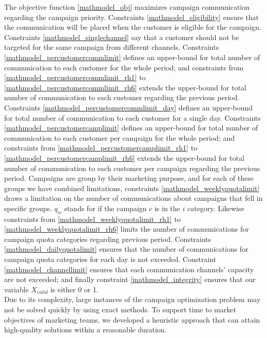 \documentclass[11pt]{article}
\begin{document}
The objective function \eqref{mathmodel_obj} maximizes campaign communication regarding the campaign priority. Constraints \eqref{mathmodel_eligibility} ensure that the communication will be placed when the customer is eligible for the campaign. Constraints \eqref{mathmodel_singlechannel} say that a customer should not be targeted for the same campaign from different channels. Constraints \eqref{mathmodel_percustomercommlimit} defines an upper-bound for total number of communication to each customer for the whole period; and constraints from \eqref{mathmodel_percustomercommlimit_rh1} to \eqref{mathmodel_percustomercommlimit_rh6} extends the upper-bound for total number of communication to each customer regarding the previous period. Constraints \eqref{mathmodel_percustomercommlimit_day} defines an upper-bound for total number of communication to each customer for a single day. Constraints \eqref{mathmodel_percustomercamplimit} defines an upper-bound for total number of communication to each customer per campaign for the whole period; and constraints from \eqref{mathmodel_percustomercamplimit_rh1} to \eqref{mathmodel_percustomercamplimit_rh6} extends the upper-bound for total number of communication to each customer per campaign regarding the previous period. Campaigns are group by their marketing purpose, and for each of these groups we have combined limitations, constraints \eqref{mathmodel_weeklyquotalimit} draws a limitation on the number of communications about campaigns that fell in specific groups. $q_{{i}{c}}$ stands for if the campaign $c$ is in the $i$ category. Likewise constraints from \eqref{mathmodel_weeklyquotalimit_rh1} to \eqref{mathmodel_weeklyquotalimit_rh6} limits the number of communications for campaign quota categories regarding previous period. Constraints \eqref{mathmodel_dailyquotalimit} ensures that the number of communications for campaign quota categories for each day is not exceeded. Constraint \eqref{mathmodel_channellimit} ensures that each communication channels' capacity are not exceeded; and finally constraint \eqref{mathmodel_integrity} ensures that our variable $X_{{c}{u}{h}{d}}$ is either 0 or 1.\\

Due to its complexity, large instances of the campaign optimization problem may not be solved quickly by using exact methods. To support time to market objectives of marketing teams, we developed a heuristic approach that can attain high-quality solutions within a reasonable duration.

\end{document}
